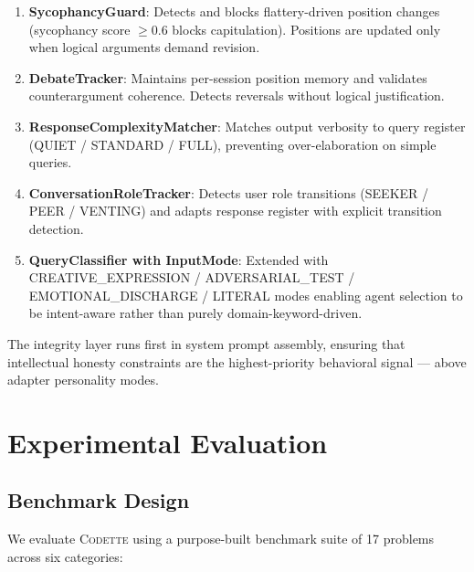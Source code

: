 \documentclass[11pt,a4paper]{article}
\newcommand{\codette}{\textsc{Codette}}
\begin{document}
\begin{enumerate}[nosep]
  \item \textbf{SycophancyGuard}: Detects and blocks flattery-driven position
    changes (sycophancy score $\geq 0.6$ blocks capitulation). Positions are
    updated only when logical arguments demand revision.
  \item \textbf{DebateTracker}: Maintains per-session position memory and
    validates counterargument coherence. Detects reversals without logical
    justification.
  \item \textbf{ResponseComplexityMatcher}: Matches output verbosity to query
    register (QUIET / STANDARD / FULL), preventing over-elaboration on simple
    queries.
  \item \textbf{ConversationRoleTracker}: Detects user role transitions
    (SEEKER / PEER / VENTING) and adapts response register with explicit
    transition detection.
  \item \textbf{QueryClassifier with InputMode}: Extended with
    CREATIVE\_EXPRESSION / ADVERSARIAL\_TEST / EMOTIONAL\_DISCHARGE / LITERAL
    modes enabling agent selection to be intent-aware rather than purely
    domain-keyword-driven.
\end{enumerate}

The integrity layer runs first in system prompt assembly, ensuring that
intellectual honesty constraints are the highest-priority behavioral signal ---
above adapter personality modes.

\section{Experimental Evaluation}
\label{sec:experiments}

\subsection{Benchmark Design}

We evaluate \codette{} using a purpose-built benchmark suite of 17 problems
across six categories:
\end{document}

